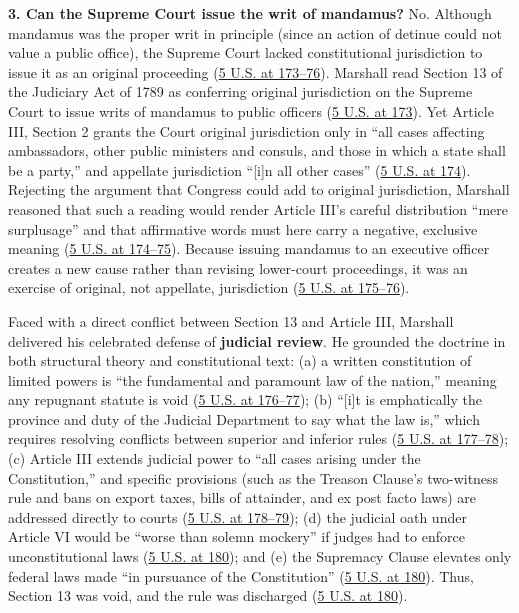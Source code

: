 \documentclass[12pt]{article}
\begin{document}
\textbf{3. Can the Supreme Court issue the writ of mandamus?} No. Although mandamus was the proper writ in principle (since an action of detinue could not value a public office), the Supreme Court lacked constitutional jurisdiction to issue it as an original proceeding (\href{https://supreme.justia.com/cases/federal/us/5/137/}{5 U.S. at 173--76}). Marshall read Section 13 of the Judiciary Act of 1789 as conferring original jurisdiction on the Supreme Court to issue writs of mandamus to public officers (\href{https://supreme.justia.com/cases/federal/us/5/137/}{5 U.S. at 173}). Yet Article III, Section 2 grants the Court original jurisdiction only in ``all cases affecting ambassadors, other public ministers and consuls, and those in which a state shall be a party,'' and appellate jurisdiction ``[i]n all other cases'' (\href{https://supreme.justia.com/cases/federal/us/5/137/}{5 U.S. at 174}). Rejecting the argument that Congress could add to original jurisdiction, Marshall reasoned that such a reading would render Article III's careful distribution ``mere surplusage'' and that affirmative words must here carry a negative, exclusive meaning (\href{https://supreme.justia.com/cases/federal/us/5/137/}{5 U.S. at 174--75}). Because issuing mandamus to an executive officer creates a new cause rather than revising lower-court proceedings, it was an exercise of original, not appellate, jurisdiction (\href{https://supreme.justia.com/cases/federal/us/5/137/}{5 U.S. at 175--76}).

Faced with a direct conflict between Section 13 and Article III, Marshall delivered his celebrated defense of \textbf{judicial review}. He grounded the doctrine in both structural theory and constitutional text: (a) a written constitution of limited powers is ``the fundamental and paramount law of the nation,'' meaning any repugnant statute is void (\href{https://supreme.justia.com/cases/federal/us/5/137/}{5 U.S. at 176--77}); (b) ``[i]t is emphatically the province and duty of the Judicial Department to say what the law is,'' which requires resolving conflicts between superior and inferior rules (\href{https://supreme.justia.com/cases/federal/us/5/137/}{5 U.S. at 177--78}); (c) Article III extends judicial power to ``all cases arising under the Constitution,'' and specific provisions (such as the Treason Clause's two-witness rule and bans on export taxes, bills of attainder, and ex post facto laws) are addressed directly to courts (\href{https://supreme.justia.com/cases/federal/us/5/137/}{5 U.S. at 178--79}); (d) the judicial oath under Article VI would be ``worse than solemn mockery'' if judges had to enforce unconstitutional laws (\href{https://supreme.justia.com/cases/federal/us/5/137/}{5 U.S. at 180}); and (e) the Supremacy Clause elevates only federal laws made ``in pursuance of the Constitution'' (\href{https://supreme.justia.com/cases/federal/us/5/137/}{5 U.S. at 180}). Thus, Section 13 was void, and the rule was discharged (\href{https://supreme.justia.com/cases/federal/us/5/137/}{5 U.S. at 180}).
\end{document}

